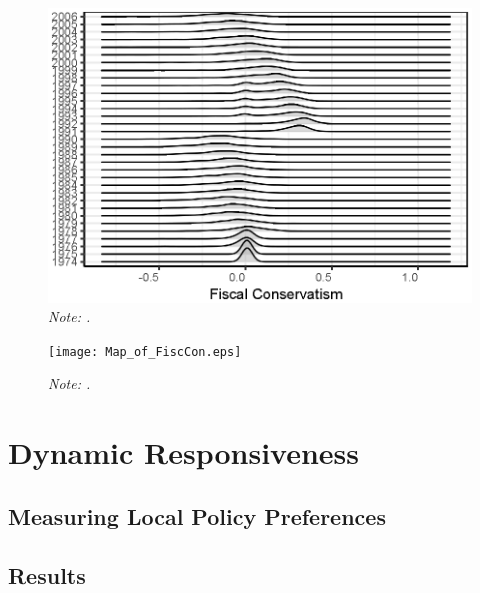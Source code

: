 \documentclass[a4paper,11pt]{article}
\newcommand\fnote[1]{\captionsetup{font=small}\caption*{#1}}
\begin{document}
\begin{figure}[!htb]
	\centering
	\includegraphics[scale = .85]{JoyPlotFiscal_inflation_adjusted.eps}
	\caption{\textbf{.}} \fnote{\emph{Note: .}}
	\label{fig:PermTest}
\end{figure}

\begin{landscape}
	\begin{figure}[!htb]
		\centering
		\texttt{[image: Map\_of\_FiscCon.eps]}
		\caption{\textbf{.}} \fnote{\emph{Note: .}}
		\label{fig:PermTest}
	\end{figure}
\end{landscape}


\section{Dynamic Responsiveness}

\subsection{Measuring Local Policy Preferences}

\subsection{Results}
\end{document}
